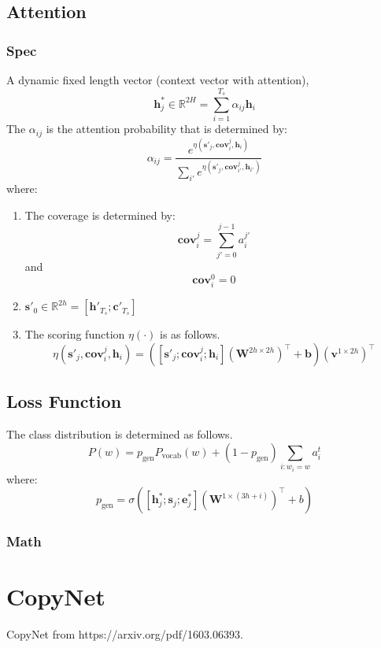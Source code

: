 \documentclass{article}
\begin{document}
  \subsection{Attention}
  \subsubsection{Spec}
  A dynamic fixed length vector (context vector with attention),
  \[
    \mathbf{h}^*_j \in \mathbb{R}^{2H}= \sum_{i = 1}^{T_s} \alpha_{ij} \mathbf{h}_i
  \]
  The $\alpha_{ij}$ is the attention probability that is determined by:
  \[
    \alpha_{ij} = \frac{e^{\eta(\mathbf{s}'_j, \mathbf{cov}^{j}_{i}, \mathbf{h}_i)}}{\sum_{i'}e^{\eta(\mathbf{s}'_j, \mathbf{cov}^{j}_{i'},\mathbf{h}_{i'})}}
  \]
  where:
  \begin{enumerate}
    \item The coverage is determined by:
    \[
      \mathbf{cov}^{j}_{i} = \sum_{j'=0}^{j-1} a^{j'}_i
    \]
    and
    \[
      \mathbf{cov}^{0}_{i} = 0
    \]
    \item $\mathbf{s}'_0 \in \mathbb{R}^{2h} = [\mathbf{h}'_{T_s}; \mathbf{c}'_{T_s}]$
    \item The scoring function $\eta(\cdot)$ is as follows.
    \[
      \eta(\mathbf{s}'_{j}, \mathbf{cov}^{j}_{i}, \mathbf{h}_i) = ([\mathbf{s}'_{j}; \mathbf{cov}^{j}_{i}; \mathbf{h}_i] (\mathbf{W}^{2h\times 2h})^\intercal + \mathbf{b}) (\mathbf{v}^{1\times 2h})^\intercal
    \]
  \end{enumerate}
  \subsection{Loss Function}
  The class distribution is determined as follows.
  \[
    P(w) = p_{\text{gen}}  P_{\text{vocab}}(w) + (1-p_{\text{gen}})\sum_{i:w_i=w}a_i^t
  \] 
  where:
  \[
    p_{\text{gen}} = \sigma([\mathbf{h}^*_j;\mathbf{s}_j;\mathbf{e}^*_j](\mathbf{W}^{1\times (3h+i)})^\intercal + b)   
  \]






\subsubsection{Math}
\section{CopyNet}
  CopyNet from https://arxiv.org/pdf/1603.06393.
\end{document}
